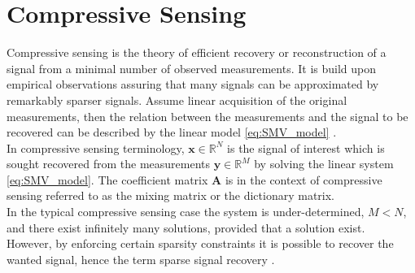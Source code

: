 \section{Compressive Sensing}\label{sec:CS}
Compressive sensing is the theory of efficient recovery or reconstruction of a signal from a minimal number of observed measurements. 
It is build upon empirical observations assuring that many signals can be approximated by remarkably sparser signals.   
Assume linear acquisition of the original measurements, then the relation between the measurements and the signal to be recovered can be described by the linear model \eqref{eq:SMV_model} \cite{FR}.  
\\ 
In compressive sensing terminology, $\mathbf{x} \in \mathbb{R}^N$ is the signal of interest which is sought recovered from the measurements $\mathbf{y} \in \mathbb{R}^M$ by solving the linear system \eqref{eq:SMV_model}. 
The coefficient matrix $\mathbf{A}$ is in the context of compressive sensing referred to as the mixing matrix or the dictionary matrix.
\\    
In the typical compressive sensing case the system is under-determined, $M < N$,  and there exist infinitely many solutions, provided that a solution exist.
\\
However, by enforcing certain sparsity constraints it is possible to recover the wanted signal, hence the term sparse signal recovery \cite{FR}.

